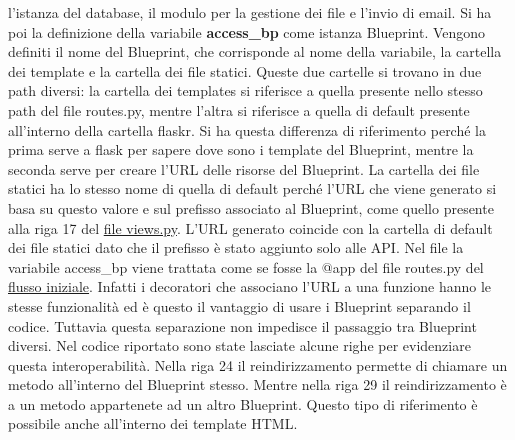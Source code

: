 l'istanza del database, il modulo per la gestione dei file e l'invio di email.
Si ha poi la definizione della variabile \textbf{access\_bp} come istanza Blueprint.
Vengono definiti il nome del Blueprint, che corrisponde al nome della variabile, 
la cartella dei template e  la cartella dei file statici.
Queste due cartelle si trovano in due path diversi:
la cartella dei templates si riferisce a quella presente nello stesso path del file routes.py,
mentre l'altra si riferisce a quella di default presente all'interno della cartella flaskr.
Si ha questa differenza di riferimento perché la prima serve a flask per sapere dove sono i template del
Blueprint, mentre la seconda serve per creare l'URL delle risorse del Blueprint.
La cartella dei file statici ha lo stesso nome di quella di default perché l'URL che viene generato si basa su questo valore
e sul prefisso associato al Blueprint, come quello presente alla riga 17 del \hyperlink{lst:flask-creazione-blueprint-views}{file views.py}. 
L'URL generato coincide con la cartella di default dei file statici 
dato che il prefisso è stato aggiunto solo alle API. 
Nel file la variabile access\_bp viene trattata come se fosse 
la @app del file routes.py del \hyperlink{lst:flask-creazione-basi-routes}{flusso iniziale}.
Infatti i decoratori che associano l'URL a una funzione hanno le stesse funzionalità
ed è questo il vantaggio di usare i Blueprint separando il codice.
Tuttavia questa separazione non impedisce il passaggio tra Blueprint diversi.
Nel codice riportato sono state lasciate alcune righe per evidenziare questa interoperabilità.
Nella riga 24 il reindirizzamento permette di chiamare un metodo all'interno del Blueprint stesso.
Mentre nella riga 29 il reindirizzamento è a un metodo appartenete ad un altro Blueprint.
Questo tipo di riferimento è possibile anche all'interno dei template HTML.

